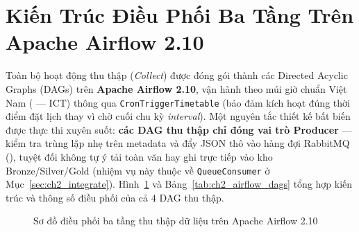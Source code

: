 
\section{Kiến Trúc Điều Phối Ba Tầng Trên Apache Airflow 2.10}
\label{sec:ch2_airflow}

Toàn bộ hoạt động thu thập (\textit{Collect}) được đóng gói thành các Directed Acyclic Graphs (DAGs) trên \textbf{Apache Airflow 2.10}, vận hành theo múi giờ chuẩn Việt Nam ( --- ICT) thông qua \texttt{CronTriggerTimetable} (bảo đảm kích hoạt đúng thời điểm đặt lịch thay vì chờ cuối chu kỳ \textit{interval}). Một nguyên tắc thiết kế bất biến được thực thi xuyên suốt: \textbf{các DAG thu thập chỉ đóng vai trò Producer} --- kiểm tra trùng lặp nhẹ trên metadata và đẩy JSON thô vào hàng đợi RabbitMQ (), tuyệt đối không tự ý tải toàn văn hay ghi trực tiếp vào kho Bronze/Silver/Gold (nhiệm vụ này thuộc về \texttt{QueueConsumer} ở Mục~\ref{sec:ch2_integrate}). Hình~\ref{fig:tier_orchestration} và Bảng~\ref{tab:ch2_airflow_dags} tổng hợp kiến trúc và thông số điều phối của cả 4 DAG thu thập.

\begin{figure}[htbp]
  \centering
  \DrawTierOrchestration
  \caption[Sơ đồ điều phối ba tầng thu thập dữ liệu trên Apache Airflow 2.10]{Sơ đồ điều phối ba tầng thu thập dữ liệu trên Apache Airflow 2.10}
  \label{fig:tier_orchestration}
\end{figure}

